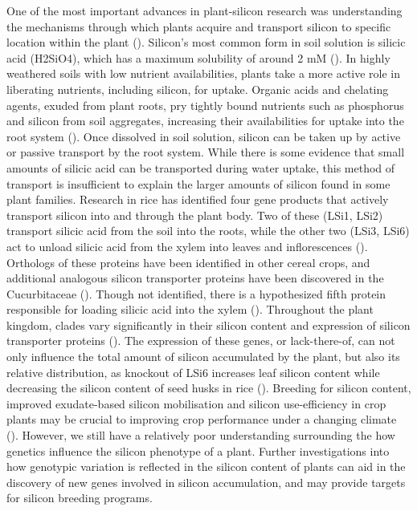 \documentclass[12pt, letterpaper, ]{report}
\begin{document}
One of the most important advances in plant-silicon research was understanding the mechanisms through which plants acquire and transport silicon to specific location within the plant (\cite{coskun_controversies_2019}). Silicon’s most common form in soil solution is silicic acid (H2SiO4), which has a maximum solubility of around 2 mM (\cite{haynes_contemporary_2014}). In highly weathered soils with low nutrient availabilities, plants take a more active role in liberating nutrients, including silicon, for uptake. Organic acids and chelating agents, exuded from plant roots, pry tightly bound nutrients such as phosphorus and silicon from soil aggregates, increasing their availabilities for uptake into the root system (\cite{de_tombeur_silicon_2021-1}). Once dissolved in soil solution, silicon can be taken up by active or passive transport by the root system. While there is some evidence that small amounts of silicic acid can be transported during water uptake, this method of transport is insufficient to explain the larger amounts of silicon found in some plant families. Research in rice has identified four gene products that actively transport silicon into and through the plant body. Two of these (LSi1, LSi2) transport silicic acid from the soil into the roots, while the other two (LSi3, LSi6) act to unload silicic acid from the xylem into leaves and inflorescences (\cite{yamaji_orchestration_2015}). Orthologs of these proteins have been identified in other cereal crops, and additional analogous silicon transporter proteins have been discovered in the Cucurbitaceae (\cite{reynolds_silicon_2016}). Though not identified, there is a hypothesized fifth protein responsible for loading silicic acid into the xylem (\cite{farooq_silicon_2015}). Throughout the plant kingdom, clades vary significantly in their silicon content and expression of silicon transporter proteins (\cite{ma_chapter_2001}). The expression of these genes, or lack-there-of, can not only influence the total amount of silicon accumulated by the plant, but also its relative distribution, as knockout of LSi6 increases leaf silicon content while decreasing the silicon content of seed husks in rice (\cite{yamaji_transporter_2008}). Breeding for silicon content, improved exudate-based silicon mobilisation and silicon use-efficiency in crop plants may be crucial to improving crop performance under a changing climate (\cite{christian_breeding_2022,de_tombeur_silicon_2021}). However, we still have a relatively poor understanding surrounding the how genetics influence the silicon phenotype of a plant. Further investigations into how genotypic variation is reflected in the silicon content of plants can aid in the discovery of new genes involved in silicon accumulation, and may provide targets for silicon breeding programs. 
 
\end{document}
